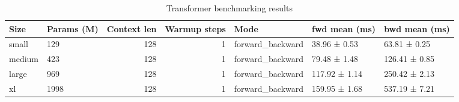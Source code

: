 \begin{table}
\caption{Transformer benchmarking results}
\label{tab:benchmarks}
\begin{tabular}{llrrlll}
\toprule
Size & Params (M) & Context len & Warmup steps & Mode & fwd mean (ms) & bwd mean (ms) \\
\midrule
small & 129 & 128 & 1 & forward_backward & 38.96 ± 0.53 & 63.81 ± 0.25 \\
medium & 423 & 128 & 1 & forward_backward & 79.48 ± 1.48 & 126.41 ± 0.85 \\
large & 969 & 128 & 1 & forward_backward & 117.92 ± 1.14 & 250.42 ± 2.13 \\
xl & 1998 & 128 & 1 & forward_backward & 159.95 ± 1.68 & 537.19 ± 7.21 \\
\bottomrule
\end{tabular}
\end{table}
